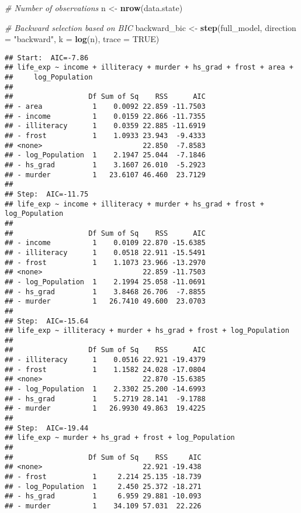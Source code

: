 \documentclass[
]{article}
\newenvironment{Shaded}{\begin{snugshade}}{\end{snugshade}}
\newcommand{\AttributeTok}[1]{\textcolor[rgb]{0.13,0.29,0.53}{#1}}
\newcommand{\CommentTok}[1]{\textcolor[rgb]{0.56,0.35,0.01}{\textit{#1}}}
\newcommand{\ConstantTok}[1]{\textcolor[rgb]{0.56,0.35,0.01}{#1}}
\newcommand{\FunctionTok}[1]{\textcolor[rgb]{0.13,0.29,0.53}{\textbf{#1}}}
\newcommand{\NormalTok}[1]{#1}
\newcommand{\OtherTok}[1]{\textcolor[rgb]{0.56,0.35,0.01}{#1}}
\newcommand{\StringTok}[1]{\textcolor[rgb]{0.31,0.60,0.02}{#1}}
\begin{document}
\begin{Shaded}
\begin{Highlighting}[]
\CommentTok{\# Number of observations}
\NormalTok{n }\OtherTok{\textless{}{-}} \FunctionTok{nrow}\NormalTok{(data.state)}

\CommentTok{\# Backward selection based on BIC}
\NormalTok{backward\_bic }\OtherTok{\textless{}{-}} \FunctionTok{step}\NormalTok{(full\_model, }
                     \AttributeTok{direction =} \StringTok{"backward"}\NormalTok{, }
                     \AttributeTok{k =} \FunctionTok{log}\NormalTok{(n), }
                     \AttributeTok{trace =} \ConstantTok{TRUE}\NormalTok{)}
\end{Highlighting}
\end{Shaded}

\begin{verbatim}
## Start:  AIC=-7.86
## life_exp ~ income + illiteracy + murder + hs_grad + frost + area + 
##     log_Population
## 
##                  Df Sum of Sq    RSS      AIC
## - area            1    0.0092 22.859 -11.7503
## - income          1    0.0159 22.866 -11.7355
## - illiteracy      1    0.0359 22.885 -11.6919
## - frost           1    1.0933 23.943  -9.4333
## <none>                        22.850  -7.8583
## - log_Population  1    2.1947 25.044  -7.1846
## - hs_grad         1    3.1607 26.010  -5.2923
## - murder          1   23.6107 46.460  23.7129
## 
## Step:  AIC=-11.75
## life_exp ~ income + illiteracy + murder + hs_grad + frost + log_Population
## 
##                  Df Sum of Sq    RSS      AIC
## - income          1    0.0109 22.870 -15.6385
## - illiteracy      1    0.0518 22.911 -15.5491
## - frost           1    1.1073 23.966 -13.2970
## <none>                        22.859 -11.7503
## - log_Population  1    2.1994 25.058 -11.0691
## - hs_grad         1    3.8468 26.706  -7.8855
## - murder          1   26.7410 49.600  23.0703
## 
## Step:  AIC=-15.64
## life_exp ~ illiteracy + murder + hs_grad + frost + log_Population
## 
##                  Df Sum of Sq    RSS      AIC
## - illiteracy      1    0.0516 22.921 -19.4379
## - frost           1    1.1582 24.028 -17.0804
## <none>                        22.870 -15.6385
## - log_Population  1    2.3302 25.200 -14.6993
## - hs_grad         1    5.2719 28.141  -9.1788
## - murder          1   26.9930 49.863  19.4225
## 
## Step:  AIC=-19.44
## life_exp ~ murder + hs_grad + frost + log_Population
## 
##                  Df Sum of Sq    RSS     AIC
## <none>                        22.921 -19.438
## - frost           1     2.214 25.135 -18.739
## - log_Population  1     2.450 25.372 -18.271
## - hs_grad         1     6.959 29.881 -10.093
## - murder          1    34.109 57.031  22.226
\end{verbatim}
\end{document}
